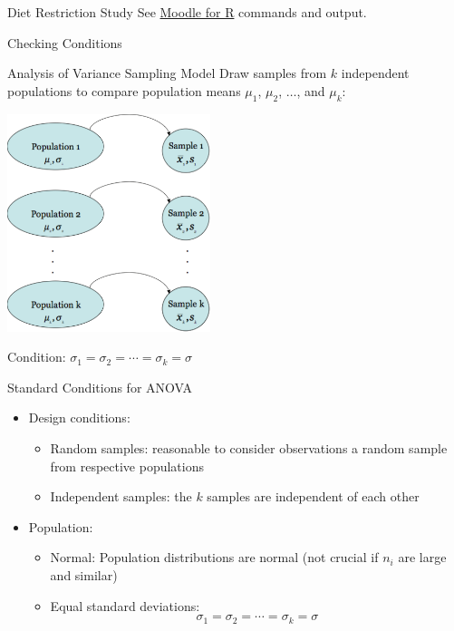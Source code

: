 \documentclass[t,xcolor=pdftex,dvipsnames,table,handout]{beamer}
\newcommand{\bi}{\begin{itemize}}
\newcommand{\ei}{\end{itemize}}
\begin{document}
\begin{frame}{Diet Restriction Study}
See \href{https://moodle.kzoo.edu/mod/page/view.php?id=334492}{Moodle for  R} commands and output.

\end{frame}
\begin{frame}
  \vskip25mm
  \centering \begin{block}
  {\Huge Checking Conditions}
\end{block}
\end{frame}

  
\begin{frame}{Analysis of Variance Sampling Model}
Draw samples from $k$ \alert{independent} populations to compare
population means $\mu_1$, $\mu_2$, $\ldots$, and $\mu_k$:
    \vspace{-1ex}
\begin{center}
\includegraphics[height=2.5in]{sampling_model.pdf}
\end{center}
 \vspace{-1ex} Condition: $\sigma_1=\sigma_2=\cdots=\sigma_k=\sigma$
\end{frame}
\begin{frame}{Standard Conditions for ANOVA}
\bi
    \item \alert{Design conditions:}
    \bi
        \item \alert{Random samples:} reasonable to consider observations
        a random sample from respective populations \pause
        \item \alert{Independent samples:} the $k$ samples are
        independent of each other
    \ei
    \pause
    \item \alert{Population:}
    \bi
        \item \alert{Normal:} Population distributions are normal
        \pause
        (not crucial if $n_i$ are large and similar)
        \pause
        \item \alert{Equal standard deviations:}
        $$
            \sigma_1=\sigma_2=\cdots=\sigma_k=\sigma
        $$
    \ei
\ei
\end{frame}
\end{document}
